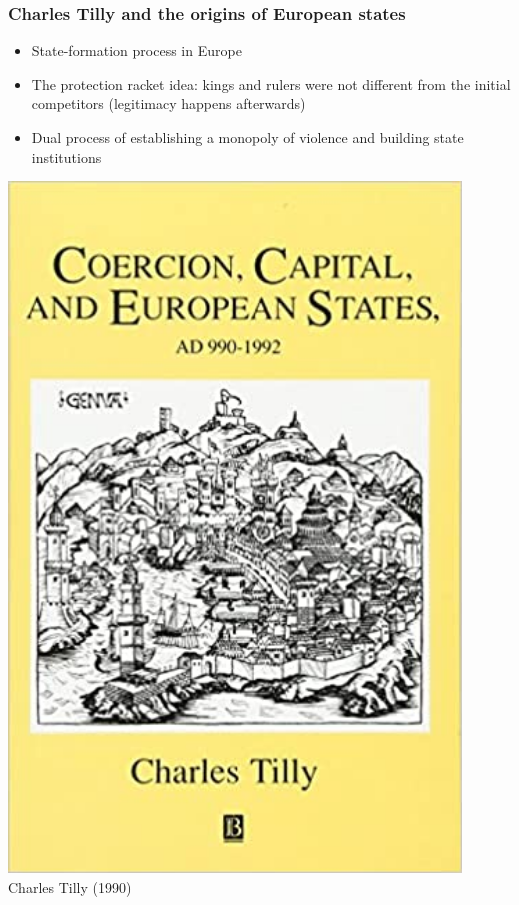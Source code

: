 \documentclass[aspectratio=43]{beamer}
\begin{document}
\begin{frame}
\frametitle{Charles Tilly and the origins of European states}
\centering

\begin{minipage}{0.66\textwidth}\centering
\begin{itemize}
\item State-formation process in Europe
\item The protection racket idea: kings and rulers were not different from the initial competitors (legitimacy happens afterwards)
\item Dual process of establishing a monopoly of violence and building state institutions
\end{itemize}
\end{minipage}\hfill
\begin{minipage}{0.33\textwidth}\centering
\includegraphics[width = 0.9\textwidth]{img/tilly_book}\\\vspace{5pt}
{\small Charles Tilly (1990)}
\end{minipage}

\end{frame}
\end{document}
